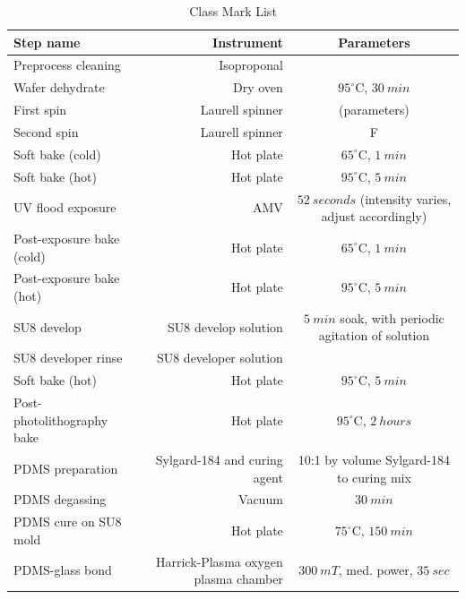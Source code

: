 			\begin{table}
				\begin{center}
				    \begin{tabular}{lrc}\hline
						Step name & Instrument & Parameters \\
						\hline
						Preprocess cleaning & Isoproponal & \\
						Wafer dehydrate & Dry oven & $95^{\circ}$C, $\SI{30}{min}$ \\
						First spin & Laurell spinner & (parameters) \\
						Second spin & Laurell spinner & F \\ \hline
						Soft bake (cold) & Hot plate & $65^{\circ}$C, $\SI{1}{min}$ \\
						Soft bake (hot) & Hot plate & $95^{\circ}$C, $\SI{5}{min}$ \\
						UV flood exposure & AMV & $\SI{52}{seconds}$ (intensity varies, adjust accordingly) \\
						Post-exposure bake (cold) & Hot plate & $65^{\circ}$C, $\SI{1}{min}$ \\
						Post-exposure bake (hot) & Hot plate & $95^{\circ}$C, $\SI{5}{min}$ \\
						SU8 develop & SU8 develop solution & $\SI{5}{min}$ soak, with periodic agitation of solution \\
						SU8 developer rinse & SU8 developer solution & \\Soft bake (hot) & Hot plate & $95^{\circ}$C, $\SI{5}{min}$ \\
						Post-photolithography bake & Hot plate & $95^{\circ}$C, $\SI{2}{hours}$ \\
						\hline
						PDMS preparation & Sylgard-184 and curing agent & 10:1 by volume Sylgard-184 to curing mix \\
						PDMS degassing & Vacuum & $\SI{30}{min}$ \\
						PDMS cure on SU8 mold & Hot plate & $75^{\circ}$C, $\SI{150}{min}$ \\
						PDMS-glass bond & Harrick-Plasma oxygen plasma chamber & $\SI{300}{mT}$, med. power, $\SI{35}{sec}$    
				    \end{tabular}
				    \caption{Class Mark List}\label{tab:devicefab}
				\end{center}
			\end{table}
			
			
			
			
			
